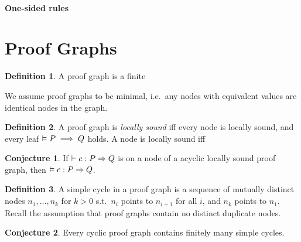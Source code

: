 \documentclass[10pt]{article}
\theoremstyle{definition}
\newtheorem{definition}{Definition}
\newtheorem{conjecture}{Conjecture}
\begin{document}
\paragraph{One-sided rules}




\section{Proof Graphs}

\begin{definition}
    A proof graph is a finite 

    We assume proof graphs to be minimal, i.e.\ any nodes with equivalent values
    are identical nodes in the graph.
\end{definition}

\begin{definition}
    A proof graph is \emph{locally sound} iff every node is locally sound,
    and every leaf $\vDash P \implies Q$ holds.
    A node is locally sound iff 
\end{definition}

\begin{conjecture}
    If $\DER \Triple c : P => Q$ is on a node of a
    acyclic locally sound proof graph,
    then $\VAL \Triple c : P => Q$.
\end{conjecture}

\begin{definition}
    A simple cycle in a proof graph is a sequence of mutually distinct nodes $n_1,\dots,n_k$ for $k > 0$
    s.t.\ $n_i$ points to $n_{i+1}$ for all $i$, and $n_k$ points to $n_1$.
    Recall the assumption that proof graphs contain no distinct duplicate nodes.
\end{definition}

\begin{conjecture}
    Every cyclic proof graph contains finitely many simple cycles.
\end{conjecture}

\end{document}
